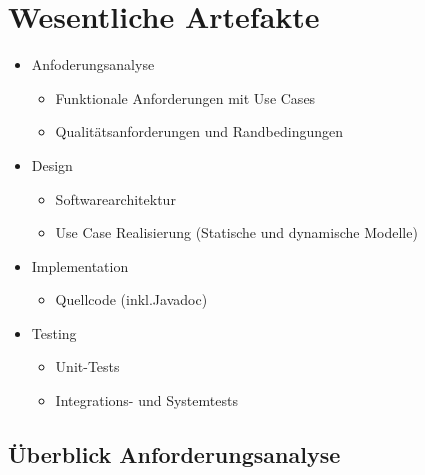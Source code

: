 \documentclass{article}
\begin{document}
\section{Wesentliche Artefakte}

\begin{itemize}
	\item Anfoderungsanalyse
	\begin{itemize}
		\item Funktionale Anforderungen mit Use Cases
		\item Qualitätsanforderungen und Randbedingungen
	\end{itemize}
	\item Design
	\begin{itemize}
		\item Softwarearchitektur
		\item Use Case Realisierung (Statische und dynamische Modelle)
	\end{itemize}
	\item Implementation
	\begin{itemize}
		\item Quellcode (inkl.Javadoc)
	\end{itemize}
	\item Testing
	\begin{itemize}
		\item Unit-Tests
		\item Integrations- und Systemtests
	\end{itemize}
\end{itemize}

\subsection{Überblick Anforderungsanalyse}
\end{document}
